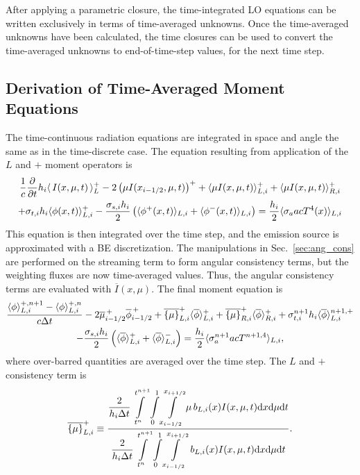 After applying a parametric closure, the time-integrated LO equations can be written exclusively in terms
of time-averaged unknowns.   Once the time-averaged unknowns have been calculated,
the time closures can be used to convert the time-averaged unknowns to end-of-time-step
values, for the next time step.

\subsection{Derivation of Time-Averaged Moment Equations}

The time-continuous radiation equations are integrated in space and angle the same as in
the time-discrete case.  The equation resulting from application of the $L$ and $+$ moment
operators is
\begin{multline}
    \frac{1}{c}   \frac{\partial  }{\partial t} h_i \langle \,I(x,\mu,t)\, \rangle^+_L - 2\left({\mu}
    I(x_{i-1/2},\mu,t)\right)^+ + \langle \mu I(x,\mu,t) \rangle^+_{L,i} 
    + \langle \mu I(x,\mu,t) \rangle^+_{R,i} \\ +  \sigma_{t,i} h_i \langle \phi(x,t) \rangle_{L,i}^{+} -
    \frac{\sigma_{s,i} h_i}{2} \left( \langle \phi^+(x,t) \rangle_{L,i} +
    \langle \phi^-(x,t) \rangle_{L,i}\right) = \frac{h_i}{2} \langle \sigma_a a c T^4(x) \rangle_{L,i} 
\end{multline}
This equation is then integrated over the time step, and the emission source is
approximated with a BE discretization.  The manipulations in Sec.~\ref{sec:ang_cons} are
performed on the streaming term to form angular consistency terms, but the weighting fluxes are now
time-averaged values.  Thus, the angular consistency terms are evaluated with $\overline
I(x,\mu)$.
The final moment equation is 
\begin{multline}\label{eq:t_moml_ex}
    \frac{\langle \phi \rangle_{L,i}^{+,n+1} - \langle \phi \rangle_{L,i}^{+,n}}{c \Delta t}
    -2\overline {\mu}_{i-1/2}^{\,+} \overline \phi_{i-1/2}^{\,+} + \overline{\left\{ \mu \right\}}_{L,i}^{+}
  \langle \overline{\phi} \rangle_{L,i}^{+}
  +  \overline{\left\{ \mu \right\}}_{R,i}^{+}
  \langle \overline{\phi} \rangle_{R,i}^{+} +  \sigma_{t,i}^{n+1} h_i 
  \langle \overline\phi \rangle_{L,i}^{n+1,+} \\-  \frac{\sigma_{s,i} h_i}{2} \left( \langle \overline{\phi} \rangle_{L,i}^{+} +
  \langle \overline{\phi} \rangle_{L,i}^{-}\right) = \frac{h_i}{2} \langle \sigma_a^{n+1} a c T^{n+1,4} \rangle_{L,i},
\end{multline}
where over-barred quantities are averaged over the time step. The $L$ and
$+$ consistency term is
\begin{equation}
    \overline{\left\{ {\mu} \right\}}_{L,i}^{+} \equiv  \frac{\displaystyle 
        {\displaystyle \frac{2}{h_i\Delta t}} \int\limits_{t^n}^{t^{n+1}} \int\limits_0^1 \int\limits_{{x_{i-1/2}}}^{{x_{i+1/2}}} \mu \, b_{L,i}(x)
I(x,\mu,t) \mathrm{d} x \mathrm{d} \mu \mathrm{d} t } 
{\displaystyle {\displaystyle \frac{2}{h_i \Delta t}}\int\limits_{t^n}^{t^{n+1}} \int\limits_0^1 \int\limits_{{x_{i-1/2}}}^{{x_{i+1/2}}} \, b_{L,i}(x)
I(x,\mu,t) \mathrm{d} x \mathrm{d} \mu \mathrm{d} t } .
\end{equation}

